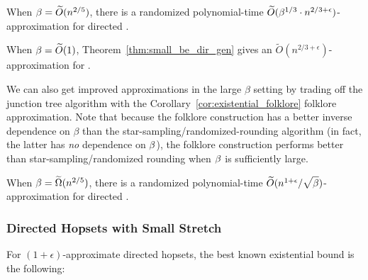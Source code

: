 \begin{theorem} \label{thm:small_be_dir_gen}
    When $\beta = \widetilde{O}(n^{2/5})$, there is a randomized polynomial-time $\widetilde{O}(\beta^{1/3} \cdot n^{2/3 + \epsilon})$-approximation for directed {\hopset}.
\end{theorem}
\begin{corollary}
    When $\beta = \widetilde{O}(1)$, Theorem~\ref{thm:small_be_dir_gen} gives an $\widetilde{O}(n^{2/3 + \epsilon})$-approximation for {\hopset}.
\end{corollary}

We can also get improved approximations in the large $\beta$ setting by trading off the junction tree algorithm with the Corollary~\ref{cor:existential_folklore} folklore approximation. Note that because the folklore construction has a better inverse dependence on $\beta$ than the star-sampling/randomized-rounding algorithm (in fact, the latter has \textit{no} dependence on $\beta$), the folklore construction performs better than star-sampling/randomized rounding when $\beta$ is sufficiently large.

\begin{theorem} \label{thm:big_be_dir_gen}
    When $\beta = \widetilde{\Omega}(n^{2/5})$, there is a randomized polynomial-time $\widetilde{O}( n^{1+\epsilon} / \sqrt{\vphantom{\be^k} \be})$-approximation for directed {\hopset}.
\end{theorem}

\subsubsection{Directed Hopsets with Small Stretch}

For $(1+\epsilon)$-approximate directed hopsets, the best known existential bound is the following:

